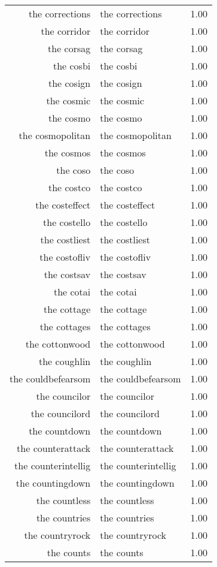 \begin{table}[ht]
\begin{tabular}{rlr}
  the corrections & the corrections & 1.00 \\ 
  the corridor & the corridor & 1.00 \\ 
  the corsag & the corsag & 1.00 \\ 
  the cosbi & the cosbi & 1.00 \\ 
  the cosign & the cosign & 1.00 \\ 
  the cosmic & the cosmic & 1.00 \\ 
  the cosmo & the cosmo & 1.00 \\ 
  the cosmopolitan & the cosmopolitan & 1.00 \\ 
  the cosmos & the cosmos & 1.00 \\ 
  the coso & the coso & 1.00 \\ 
  the costco & the costco & 1.00 \\ 
  the costeffect & the costeffect & 1.00 \\ 
  the costello & the costello & 1.00 \\ 
  the costliest & the costliest & 1.00 \\ 
  the costofliv & the costofliv & 1.00 \\ 
  the costsav & the costsav & 1.00 \\ 
  the cotai & the cotai & 1.00 \\ 
  the cottage & the cottage & 1.00 \\ 
  the cottages & the cottages & 1.00 \\ 
  the cottonwood & the cottonwood & 1.00 \\ 
  the coughlin & the coughlin & 1.00 \\ 
  the couldbefearsom & the couldbefearsom & 1.00 \\ 
  the councilor & the councilor & 1.00 \\ 
  the councilord & the councilord & 1.00 \\ 
  the countdown & the countdown & 1.00 \\ 
  the counterattack & the counterattack & 1.00 \\ 
  the counterintellig & the counterintellig & 1.00 \\ 
  the countingdown & the countingdown & 1.00 \\ 
  the countless & the countless & 1.00 \\ 
  the countries & the countries & 1.00 \\ 
  the countryrock & the countryrock & 1.00 \\ 
  the counts & the counts & 1.00 \\ 

\end{tabular}
\end{table}
